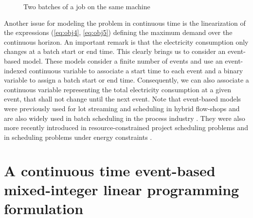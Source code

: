 \begin{figure}[htbp]
\centering {}  
\caption{Two batches of a job on the same machine}
\label{fig_contrex-1batch}
\end{figure}


Another issue for modeling the problem in continuous time is the
linearization of the expressions (\ref{eq:obj4}, \ref{eq:obj5})
defining the maximum demand over the continuous horizon. An important
remark is that the electricity consumption only changes at a batch
start or end time.  This clearly brings us to consider an event-based
model. These models consider a finite number of events and use an
event-indexed continuous variable to associate a start time to each
event and a binary variable to assign a batch start or end
time. Consequently, we can also associate a continuous variable
representing the total electricity consumption at a given event, that
shall not change until the next event.  Note that event-based models
were previously used for lot streaming and scheduling in hybrid
flow-shops \cite{defersha2012mathematical} and are also widely used in
batch scheduling in the process industry \cite{floudas2005mixed}. They
were also more recently introduced in resource-constrained project
scheduling problems \cite{KALM10d} and in scheduling problems under
energy constraints \cite{nataff2015}.

\section{A continuous time event-based mixed-integer linear programming formulation}
\label{sec:milp}


